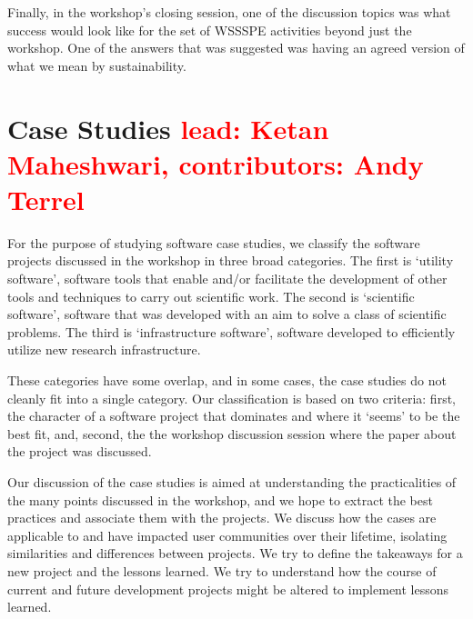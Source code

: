\documentclass[11pt, oneside]{amsart}
\newcommand{\note}[1]{ {\textcolor{red}    { #1 }}}
\begin{document}
Finally, in the workshop's closing session, one of the discussion topics was
what success would look like for the set of WSSSPE activities beyond just the workshop.
One of the answers that was suggested was
having an agreed version of what we mean by sustainability.


\section{Case Studies \note{lead: Ketan Maheshwari, contributors: Andy Terrel}} \label{sec:use-cases}


For the purpose of studying software case studies, we classify the software
projects discussed in the workshop in three broad categories. The first is 
`utility software', software tools that enable and/or facilitate the
development of other tools and techniques to carry out scientific work. The second is
`scientific software', software that was developed with an aim to solve a
class of scientific problems. The third is `infrastructure software', software
developed to efficiently utilize new research infrastructure.

These categories have some overlap, and in some cases, the
case studies do not cleanly fit into a single category.
Our classification is based on two criteria: first, the character
of a software project that dominates and where it `seems' to be the best fit, and, second,
the the workshop discussion session where the paper about
the project was discussed. 


Our discussion of the case studies is aimed at understanding the practicalities of
the many points discussed in the workshop, and we hope to extract the best
practices and associate them with the projects. We discuss how the cases are
applicable to and have impacted user communities over their lifetime, isolating
similarities and differences between projects. We try to define the takeaways for a new
project and the lessons learned. We try to understand how the course of current and
future development projects might be altered to implement lessons learned. 
\end{document}
